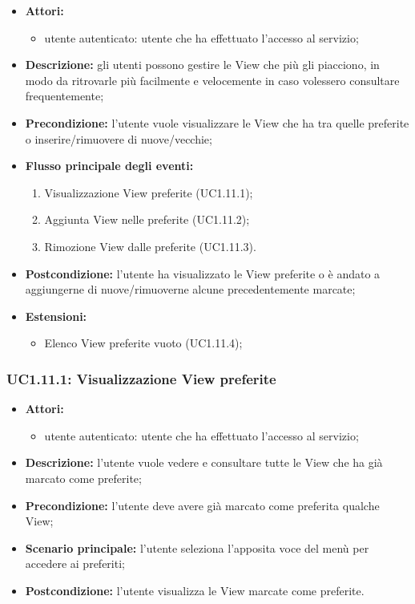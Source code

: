 \begin{itemize}
	\item \textbf{Attori:}
	\begin{itemize}
		\item utente autenticato: utente che ha effettuato l'accesso al servizio;
	\end{itemize}
	\item \textbf{Descrizione:} gli utenti possono gestire le View che più gli piacciono, in modo da ritrovarle più facilmente e velocemente in caso volessero consultare frequentemente;
	\item \textbf{Precondizione:} l'utente vuole visualizzare le View che ha tra quelle preferite o inserire/rimuovere di nuove/vecchie;
	\item \textbf{Flusso principale degli eventi:}
	\begin{enumerate}
		\item Visualizzazione View preferite (UC1.11.1);
		\item Aggiunta View nelle preferite (UC1.11.2);
		\item Rimozione View dalle preferite (UC1.11.3).
	\end{enumerate}
	\item \textbf{Postcondizione:} l'utente ha visualizzato le View preferite o è andato a aggiungerne di nuove/rimuoverne alcune precedentemente marcate;
	\item \textbf{Estensioni:}
	\begin{itemize}
		\item Elenco View preferite vuoto (UC1.11.4);
	\end{itemize}
\end{itemize}

\subsubsection{UC1.11.1: Visualizzazione View preferite}
\begin{itemize}
	\item \textbf{Attori:}
	\begin{itemize}
		\item utente autenticato: utente che ha effettuato l'accesso al servizio;
	\end{itemize}
	\item \textbf{Descrizione:} l'utente vuole vedere e consultare tutte le View che ha già marcato come preferite;
	\item \textbf{Precondizione:} l'utente deve avere già marcato come preferita qualche View;
	\item \textbf{Scenario principale:} l'utente seleziona l'apposita voce del menù per accedere ai preferiti;
	\item \textbf{Postcondizione:} l'utente visualizza le View marcate come preferite.
\end{itemize}

